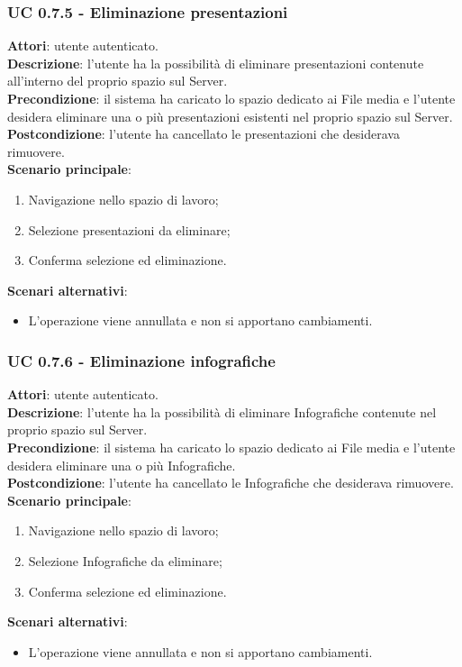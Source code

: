 	\subsubsection{UC 0.7.5 - Eliminazione presentazioni}{
		\label{uc0.7.5}
		\textbf{Attori}: utente autenticato.	\\
		\textbf{Descrizione}: l'utente ha la possibilità di eliminare presentazioni contenute all'interno del proprio spazio sul Server. \\
		\textbf{Precondizione}: il sistema ha caricato lo spazio dedicato ai File media e l'utente desidera eliminare una o più presentazioni esistenti nel proprio spazio sul Server.	\\
		\textbf{Postcondizione}: l'utente ha cancellato le presentazioni che desiderava rimuovere.	\\
		\textbf{Scenario principale}:
		\begin{enumerate}
			\item Navigazione nello spazio di lavoro;
			\item Selezione presentazioni da eliminare;
			\item Conferma selezione ed eliminazione.
		\end{enumerate}
		\textbf{Scenari alternativi}: 
		\begin{itemize}
			\item L'operazione viene annullata e non si apportano cambiamenti.
		\end{itemize}
		}
	\subsubsection{UC 0.7.6 - Eliminazione infografiche}{
		\label{uc0.7.6}
		\textbf{Attori}: utente autenticato.	\\
		\textbf{Descrizione}: l'utente ha la possibilità di eliminare Infografiche contenute nel proprio spazio sul Server. \\
		\textbf{Precondizione}: il sistema ha caricato lo spazio dedicato ai File media e l'utente desidera eliminare una o più Infografiche.	\\
		\textbf{Postcondizione}: l'utente ha cancellato le Infografiche che desiderava rimuovere.	\\
		\textbf{Scenario principale}:
		\begin{enumerate}
			\item Navigazione nello spazio di lavoro;
			\item Selezione Infografiche da eliminare;
			\item Conferma selezione ed eliminazione.
		\end{enumerate}
		\textbf{Scenari alternativi}: 
		\begin{itemize}
			\item L'operazione viene annullata e non si apportano cambiamenti.
		\end{itemize}
		}
